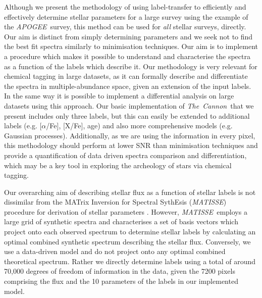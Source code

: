 \documentclass[12pt, preprint]{aastex}
\newcommand{\tc}{\textsl{The~Cannon}}
\newcommand{\apogee}{\textsl{APOGEE}}
\newcommand{\matisse}{\textsl{MATISSE}}
\begin{document}
Although we present the methodology of using label-transfer to efficiently and effectively determine stellar parameters for a large survey using the example of the \apogee\ survey, this method can be used for \textit{all} stellar surveys, directly.  Our aim is distinct from simply determining parameters and we seek not to find the best fit spectra similarly to minimisation techniques. Our aim is to implement a procedure which makes it possible to understand and characterise the spectra as a function of the labels which describe it.  Our methodology is very relevant for chemical tagging in large datasets, as it can formally describe and differentiate the spectra in multiple-abundance space, given an extension of the input labels. In the same way it is possible to implement a differential analysis on large datasets using this approach. Our basic implementation of \tc\ that we present includes only three labels, but this can easily be extended to additional labels  (e.g. [$\alpha$/Fe], [X/Fe], age) and also more comprehensive models (e.g. Gaussian processes). Additionally, as we are using the information in every pixel, this methodology should perform at lower SNR than minimisation techniques and provide a quantification of data driven spectra comparison and differentiation, which may be a key tool in exploring the archeology of stars via chemical tagging. 

Our overarching aim of describing stellar flux as a function of stellar labels is not dissimilar from the MATrix Inversion for Spectral SythEsis (\matisse) procedure for derivation of stellar parameters \citep{RB2006}. However, \matisse\ employs a large grid of synthetic spectra and characterises a set of basis vectors which project onto each observed spectrum to determine stellar labels by calculating an optimal combined synthetic spectrum describing the stellar flux. Conversely, we use a data-driven model and do not project onto any optimal combined theoretical spectrum. Rather we directly determine labels using a total of around 70,000 degrees of freedom of information in the data, given the 7200 pixels comprising the flux and the 10 parameters of the labels in our implemented model. 
\end{document}
